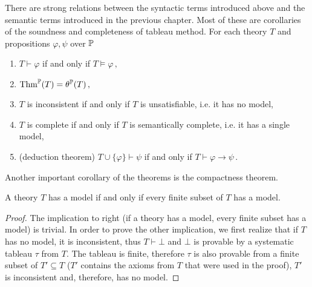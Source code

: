 There are strong relations between the syntactic terms introduced above and the semantic terms introduced in the previous chapter. Most of these are corollaries of the soundness and completeness of tableau method. For each theory $T$ and propositions $\varphi, \psi$ over $\mathbb{P}$ 
\begin{enumerate}
	\item $T \vdash \varphi$ if and only if $T \vDash \varphi\,,$
	\item $\operatorname{Thm}^\mathbb{P}(T) = \theta^\mathbb{P}(T)\,,$
	\item $T$ is inconsistent if and only if $T$ is unsatisfiable, i.e. it has no model,
	\item $T$ is complete if and only if $T$ is semantically complete, i.e. it has a single model,
	\item (deduction theorem) $T \cup \{\varphi\} \vdash \psi$ if and only if $T \vdash \varphi \to \psi\,.$
\end{enumerate}

Another important corollary of the theorems is the compactness theorem.

\begin{theorem}
A theory $T$ has a model if and only if every finite subset of $T$ has a model.
\end{theorem}
\begin{proof}
The implication to right (if a theory has a model, every finite subset has a model) is trivial. In order to prove the other implication, we first realize that if $T$ has no model, it is inconsistent, thus $T \vdash \bot$ and $\bot$ is provable by a systematic tableau $\tau$ from $T$. The tableau is finite, therefore $\tau$ is also provable from a finite subset of $T' \subseteq T$ ($T'$ contains the axioms from $T$ that were used in the proof), $T'$ is inconsistent and, therefore, has no model.
\end{proof}

